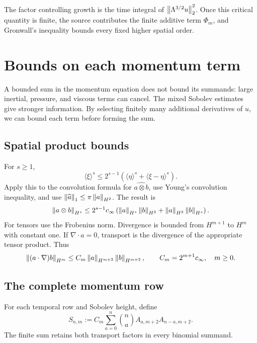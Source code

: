 The factor controlling growth is the time integral of
\(\left\lVert \Lambda^{3/2}u\right\rVert_2^2\). Once this critical quantity is finite,
the source contributes the finite additive term \(\Phi_m\), and
Gronwall's inequality bounds every fixed higher spatial order.

\section{Bounds on each momentum term}
\label{r:sec:individual}

A bounded sum in the momentum equation does not bound its summands:
large inertial, pressure, and viscous terms can cancel. The mixed
Sobolev estimates give stronger information. By selecting finitely
many additional derivatives of \(u\), we can bound each term before
forming the sum.

\subsection{Spatial product bounds}

For \(s\ge1\),
\[
 \langle\xi\rangle^s\le
 2^{s-1}\left(\langle\eta\rangle^s+
 \langle\xi-\eta\rangle^s\right).
\]
Apply this to the convolution formula for \(\widehat{a\otimes b}\),
use Young's convolution inequality, and use
\(\left\lVert \widehat a\right\rVert_1\le\pi\left\lVert a\right\rVert_{H^2}\). The result is
\begin{equation}
 \left\lVert a\otimes b\right\rVert_{H^s}
 \le 2^{s-1}c_\infty
 \left(\left\lVert a\right\rVert_{H^s}\left\lVert b\right\rVert_{H^2}+
 \left\lVert a\right\rVert_{H^2}\left\lVert b\right\rVert_{H^s}\right).
 \label{r:eq:product}
\end{equation}
For tensors use the Frobenius norm. Divergence is bounded from \(H^{m+1}\)
to \(H^m\) with constant one. If \(\nabla\cdot a=0\), transport is
the divergence of the appropriate tensor product. Thus
\begin{equation}
 \left\lVert (a\cdot\nabla)b\right\rVert_{H^m}
 \le C_m\left\lVert a\right\rVert_{H^{m+2}}\left\lVert b\right\rVert_{H^{m+2}},
 \qquad C_m=2^{m+1}c_\infty,\quad m\ge0.
 \label{r:eq:transport-product}
\end{equation}

\subsection{The complete momentum row}

For each temporal row and Sobolev height, define
\begin{equation}
 S_{n,m}:=C_m\sum_{a=0}^n\binom na
 A_{a,m+2}A_{n-a,m+2}.
 \label{r:eq:S}
\end{equation}
The finite sum retains both transport factors in every binomial summand.

